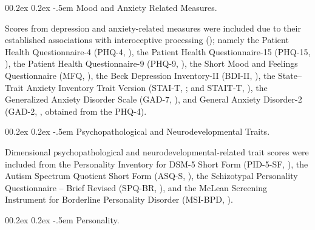\documentclass[
  jou,
  floatsintext,
  longtable,
  nolmodern,
  notxfonts,
  notimes,
  colorlinks=true,linkcolor=blue,citecolor=blue,urlcolor=blue]{apa7}
\makeatletter
\renewcommand{\paragraph}{\@startsection{paragraph}{4}{\parindent}%
	{0\baselineskip \@plus 0.2ex \@minus 0.2ex}%
	{-.5em}%
	{\normalfont\normalsize\bfseries\typesectitle}}
\makeatother
\begin{document}
\paragraph{Mood and Anxiety Related
Measures.}\label{mood-and-anxiety-related-measures}

Scores from depression and anxiety-related measures were included due to
their established associations with interoceptive processing
(); namely the Patient Health Questionnaire-4 (PHQ-4,
), the Patient
Health Questionnaire-15 (PHQ-15, ), the Patient Health Questionnaire-9 (PHQ-9,
), the Short Mood and
Feelings Questionnaire (MFQ, ), the Beck Depression Inventory-II (BDI-II,
), the State--Trait
Anxiety Inventory Trait Version (STAI-T,
; and STAIT-T,
), the
Generalized Anxiety Disorder Scale (GAD-7,
), and General
Anxiety Disorder-2 (GAD-2, , obtained from the PHQ-4).

\paragraph{Psychopathological and Neurodevelopmental
Traits.}\label{psychopathological-and-neurodevelopmental-traits}

Dimensional psychopathological and neurodevelopmental-related trait
scores were included from the Personality Inventory for DSM-5 Short Form
(PID-5-SF, ), the
Autism Spectrum Quotient Short Form (ASQ-S,
), the
Schizotypal Personality Questionnaire -- Brief Revised (SPQ-BR,
), and the
McLean Screening Instrument for Borderline Personality Disorder
(MSI-BPD, ).

\paragraph{Personality.}\label{personality}
\end{document}
